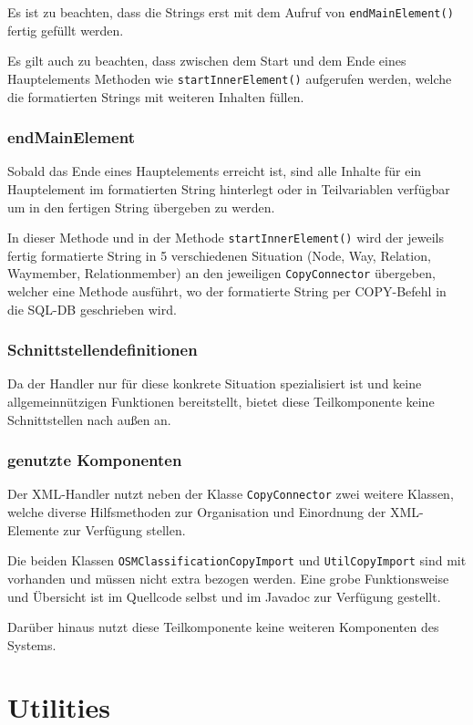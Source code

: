 Es ist zu beachten, dass die Strings erst mit dem Aufruf von {\tt endMainElement()} fertig gefüllt werden.

Es gilt auch zu beachten, dass zwischen dem Start und dem Ende eines Hauptelements Methoden wie {\tt startInnerElement()} aufgerufen werden, welche die formatierten Strings mit weiteren Inhalten füllen.

\subsubsection{endMainElement}
Sobald das Ende eines Hauptelements erreicht ist, sind alle Inhalte für ein Hauptelement im formatierten String hinterlegt oder in Teilvariablen verfügbar um in den fertigen String übergeben zu werden.

In dieser Methode und in der Methode {\tt startInnerElement()} wird der jeweils fertig formatierte String in 5 verschiedenen Situation (Node, Way, Relation, Waymember, Relationmember) an den jeweiligen {\tt CopyConnector} übergeben, welcher eine Methode ausführt, wo der formatierte String per COPY-Befehl in die SQL-DB geschrieben wird.

\subsubsection{Schnittstellendefinitionen}
Da der Handler nur für diese konkrete Situation spezialisiert ist und keine allgemeinnützigen Funktionen bereitstellt, bietet diese Teilkomponente keine Schnittstellen nach außen an.

\subsubsection{genutzte Komponenten}
Der XML-Handler nutzt neben der Klasse {\tt CopyConnector} zwei weitere Klassen, welche diverse Hilfsmethoden zur Organisation und Einordnung der XML-Elemente zur Verfügung stellen.

Die beiden Klassen {\tt OSMClassificationCopyImport} und {\tt UtilCopyImport} sind mit vorhanden und müssen nicht extra bezogen werden. Eine grobe Funktionsweise und Übersicht ist im Quellcode selbst und im Javadoc zur Verfügung gestellt.

Darüber hinaus nutzt diese Teilkomponente keine weiteren Komponenten des Systems.

\section{Utilities}
